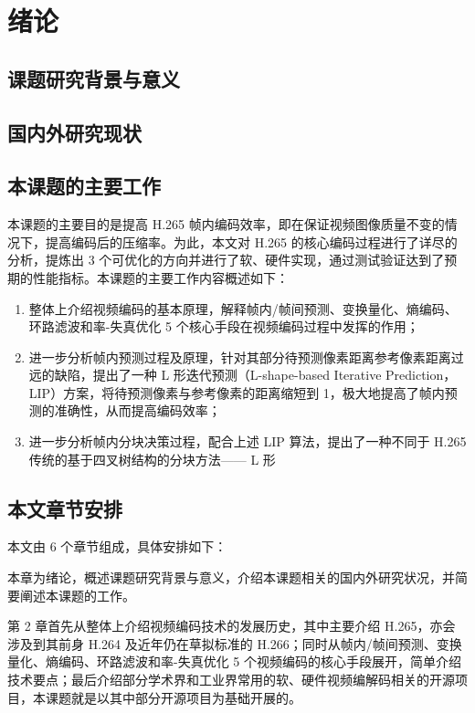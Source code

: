 \chapter{绪论}
\label{cha:c1}

\section{课题研究背景与意义}

\section{国内外研究现状}
\cite{SAP-SAP1}

\section{本课题的主要工作}
本课题的主要目的是提高 H.265 帧内编码效率，即在保证视频图像质量不变的情况下，提高编码后的压缩率。为此，本文对 H.265 的核心编码过程进行了详尽的分析，提炼出 3 个可优化的方向并进行了软、硬件实现，通过测试验证达到了预期的性能指标。本课题的主要工作内容概述如下：
\begin{enumerate}
    \item 整体上介绍视频编码的基本原理，解释帧内/帧间预测、变换量化、熵编码、环路滤波和率-失真优化 5 个核心手段在视频编码过程中发挥的作用；
    \item 进一步分析帧内预测过程及原理，针对其部分待预测像素距离参考像素距离过远的缺陷，提出了一种 L 形迭代预测（L-shape-based Iterative Prediction，LIP）方案，将待预测像素与参考像素的距离缩短到 1，极大地提高了帧内预测的准确性，从而提高编码效率；
    \item 进一步分析帧内分块决策过程，配合上述 LIP 算法，提出了一种不同于 H.265 传统的基于四叉树结构的分块方法—— L 形
\end{enumerate}

\section{本文章节安排}
本文由 6 个章节组成，具体安排如下：

本章为绪论，概述课题研究背景与意义，介绍本课题相关的国内外研究状况，并简要阐述本课题的工作。

第 2 章首先从整体上介绍视频编码技术的发展历史，其中主要介绍 H.265，亦会涉及到其前身 H.264 及近年仍在草拟标准的 H.266；同时从帧内/帧间预测、变换量化、熵编码、环路滤波和率-失真优化 5 个视频编码的核心手段展开，简单介绍技术要点；最后介绍部分学术界和工业界常用的软、硬件视频编解码相关的开源项目，本课题就是以其中部分开源项目为基础开展的。

